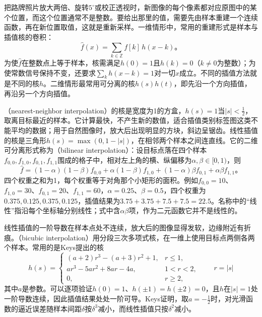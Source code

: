 把路牌照片放大两倍、旋转$5^\circ$或校正透视时，新图像的每个像素都对应原图中的某个位置，而这个位置通常不是整数。要给出那里的值，需要先由样本重建一个连续函数，再在新位置取值，这就是重新采样。一维情形中，常用的重建形式是样本与插值核的卷积：
\begin{equation}
  \hat f(x)=\sum_{k\in\mathbb{Z}}f[k]\,h(x-k)\text{。}
  \label{eq:vision-formation-interpolation-kernel}
\end{equation}
为使$\hat f$在整数点上等于样本，核需满足$h(0)=1$且$h(k)=0$（$k\neq0$为整数）；为使常数信号保持不变，还要求$\sum_k h(x-k)=1$对一切$x$成立。不同的插值方法就是不同的核$h$。二维情形最常用可分离的核$h(s)h(t)$，即先沿一个方向插值，再沿另一个方向插值。

（nearest-neighbor interpolation）的核是宽度为1的方盒，$h(s)=1$当$\lvert s\rvert<\tfrac12$，取离目标最近的样本。它计算最快，不产生新的数值，适合插值类别标签图这类不能平均的数据；用于自然图像时，放大后出现明显的方块，斜边呈锯齿。线性插值的核是三角形$h(s)=\max(0,1-\lvert s\rvert)$，在相邻两个样本之间连直线。它的二维可分离形式称为（bilinear interpolation）：设目标点落在四个样本$f_{0,0},f_{1,0},f_{0,1},f_{1,1}$围成的格子中，相对左上角的横、纵偏移为$\alpha,\beta\in[0,1)$，则
\begin{equation}
  \hat f=(1-\alpha)(1-\beta)f_{0,0}+\alpha(1-\beta)f_{1,0}
        +(1-\alpha)\beta f_{0,1}+\alpha\beta f_{1,1}\text{。}
  \label{eq:vision-formation-bilinear}
\end{equation}
四个权重之和为1，每个权重等于对角那个小矩形的面积。例如$f_{0,0}=10$、$f_{1,0}=30$、$f_{0,1}=20$、$f_{1,1}=60$，$\alpha=0.25$、$\beta=0.5$，四个权重为$0.375,0.125,0.375,0.125$，插值结果为$3.75+3.75+7.5+7.5=22.5$。名称中的“线性”指沿每个坐标轴分别线性；式中含$\alpha\beta$项，作为二元函数它并不是线性的。

线性插值的一阶导数在样本点处不连续，放大后的图像显得发软，边缘附近有折痕。（bicubic interpolation）用分段三次多项式核，在一维上使用目标点两侧各两个样本。常用的是Keys提出的核
\begin{equation}
  h(s)=\begin{cases}
    (a+2)r^3-(a+3)r^2+1, & r\le1,\\
    ar^3-5ar^2+8ar-4a, & 1<r<2,\\
    0, & r\ge2,
  \end{cases}\qquad r=\lvert s\rvert
  \label{eq:vision-formation-keys-kernel}
\end{equation}
其中$a$是参数。可以逐项验证$h(0)=1$、$h(\pm1)=h(\pm2)=0$，且$h$在$\lvert s\rvert=1$处一阶导数连续，因此插值结果处处一阶可导。Keys证明，取$a=-\tfrac12$时，对光滑函数的逼近误差随样本间距$\delta$按$\delta^3$减小，而线性插值只按$\delta^2$减小。

